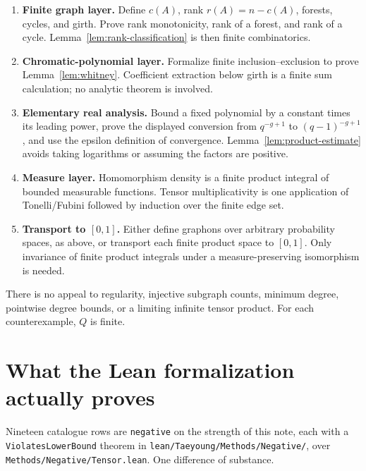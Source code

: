 \documentclass[11pt]{article}
\begin{document}
\begin{enumerate}
    \item \textbf{Finite graph layer.}  Define \(c(A)\), rank
    \(r(A)=n-c(A)\), forests, cycles, and girth.  Prove rank monotonicity,
    rank of a forest, and rank of a cycle.  Lemma~\ref{lem:rank-classification}
    is then finite combinatorics.
    \item \textbf{Chromatic-polynomial layer.}  Formalize finite
    inclusion--exclusion to prove Lemma~\ref{lem:whitney}.  Coefficient
    extraction below girth is a finite sum calculation; no analytic
    theorem is involved.
    \item \textbf{Elementary real analysis.}  Bound a fixed polynomial
    by a constant times its leading power, prove the displayed conversion
    from \(q^{-g+1}\) to \((q-1)^{-g+1}\), and use the
    epsilon definition of convergence.  Lemma~\ref{lem:product-estimate}
    avoids taking logarithms or assuming the factors are positive.
    \item \textbf{Measure layer.}  Homomorphism density is a finite
    product integral of bounded measurable functions.  Tensor
    multiplicativity is one application of Tonelli/Fubini followed by
    induction over the finite edge set.
    \item \textbf{Transport to \([0,1]\).}  Either define graphons over
    arbitrary probability spaces, as above, or transport each finite
    product space to \([0,1]\).  Only invariance of finite product
    integrals under a measure-preserving isomorphism is needed.
\end{enumerate}

There is no appeal to regularity, injective subgraph counts, minimum
degree, pointwise degree bounds, or a limiting infinite tensor product.
For each counterexample, \(Q\) is finite.

\appendix
\section{What the Lean formalization actually proves}

Nineteen catalogue rows are \texttt{negative} on the strength of this note, each
with a \texttt{ViolatesLowerBound} theorem in
\texttt{lean/Taeyoung/Methods/Negative/}, over
\texttt{Methods/Negative/Tensor.lean}.  One difference of substance.
\end{document}
